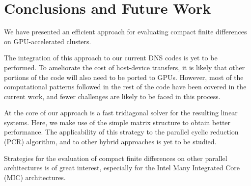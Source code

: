 \chapter{Conclusions and Future Work}

We have presented an efficient approach for evaluating
compact finite differences on GPU-accelerated clusters.

The integration of this approach to our
current DNS codes is yet to be performed.
To ameliorate the cost of host-device transfers,
it is likely that other portions of the code
will also need to be ported to GPUs.
However,
most of the computational patterns
followed in the rest of the code
have been covered in the current work,
and fewer challenges are likely to be faced
in this process.

At the core of our approach is a
fast tridiagonal solver for the resulting linear systems.
Here, we make use of the simple matrix structure
to obtain better performance.
The applicability of this strategy to the
parallel cyclic reduction (PCR) algorithm,
and to other hybrid approaches is yet to be studied.

Strategies for the evaluation of compact finite differences
on other parallel architectures is of great interest,
especially for the Intel Many Integrated Core (MIC)
architectures.
